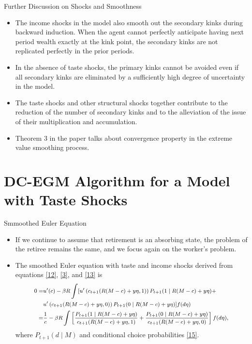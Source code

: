 \documentclass[aspectratio=169]{beamer}
\begin{document}
\begin{frame}{Further Discussion on Shocks and Smoothness}
	\begin{itemize}
		\item The income shocks in the model also smooth out the secondary kinks during backward induction. When the agent cannot perfectly anticipate having next period wealth exactly at the kink point, the secondary kinks are not replicated perfectly in the prior periods.
		\item In the absence of taste shocks, the primary kinks cannot be avoided even if all secondary kinks are eliminated by a sufficiently high degree of uncertainty in the model.
		\item The taste shocks and other structural shocks together contribute to the reduction of the number of secondary kinks and to the alleviation of the issue of their multiplication and accumulation.
		\item Theorem 3 in the paper talks about convergence property in the extreme value smoothing process.
	\end{itemize}
\end{frame}

\section[DC-EGM with Taste Shocks]{DC-EGM Algorithm for a Model with Taste Shocks}

\begin{frame}{Smmoothed Euler Equation}
	\begin{itemize}
		\item If we continue to assume that retirement is an absorbing state, the problem of the retiree remains the same, and we focus again on the worker's problem.
		\item The smoothed Euler equation with taste and income shocks derived from equations \ref{12}, \ref{3}, and \ref{13} is 
		\begin{equation} \footnotesize
			\label{17}
			\begin{aligned}
				0= & u^{\prime}(c)-\beta R \int [u^{\prime}\left(c_{t+1}(R(M-c)+y \eta, 1)\right) P_{t+1}(1 \mid R(M-c)+y \eta)+ \\
				& u^{\prime}\left(c_{t+1}(R(M-c)+y \eta, 0)\right) P_{t+1}(0 \mid R(M-c)+y \eta)] f(d \eta) \\
				= & \frac{1}{c}-\beta R \int\left[\frac{P_{t+1}(1 \mid R(M-c)+y \eta)}{c_{t+1}(R(M-c)+y \eta, 1)}+\frac{P_{t+1}(0 \mid R(M-c)+y \eta)}{c_{t+1}(R(M-c)+y \eta, 0)}\right] f(d \eta),
			\end{aligned}
		\end{equation}
		where $P_{t+1}(d \mid M)$ and conditional choice probabilities \ref{15}.
	\end{itemize}
\end{frame}
\end{document}
